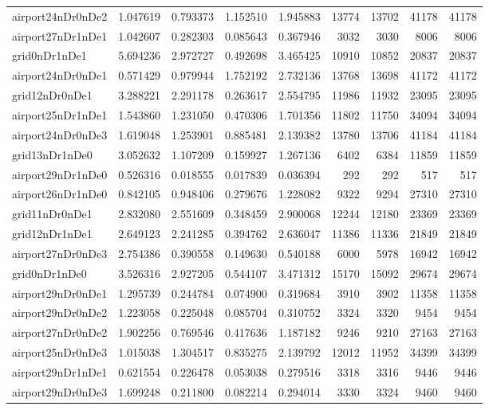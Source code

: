 \begin{longtable}{|l|r|r|r|r|r|r|r|r|}
airport24nDr0nDe2 & 1.047619 & 0.793373 & 1.152510 & 1.945883 & 13774 & 13702 & 41178 & 41178 \\
airport27nDr1nDe1 & 1.042607 & 0.282303 & 0.085643 & 0.367946 & 3032 & 3030 & 8006 & 8006 \\
grid0nDr1nDe1 & 5.694236 & 2.972727 & 0.492698 & 3.465425 & 10910 & 10852 & 20837 & 20837 \\
airport24nDr0nDe1 & 0.571429 & 0.979944 & 1.752192 & 2.732136 & 13768 & 13698 & 41172 & 41172 \\
grid12nDr0nDe1 & 3.288221 & 2.291178 & 0.263617 & 2.554795 & 11986 & 11932 & 23095 & 23095 \\
airport25nDr1nDe1 & 1.543860 & 1.231050 & 0.470306 & 1.701356 & 11802 & 11750 & 34094 & 34094 \\
airport24nDr0nDe3 & 1.619048 & 1.253901 & 0.885481 & 2.139382 & 13780 & 13706 & 41184 & 41184 \\
grid13nDr1nDe0 & 3.052632 & 1.107209 & 0.159927 & 1.267136 & 6402 & 6384 & 11859 & 11859 \\
airport29nDr1nDe0 & 0.526316 & 0.018555 & 0.017839 & 0.036394 & 292 & 292 & 517 & 517 \\
airport26nDr1nDe0 & 0.842105 & 0.948406 & 0.279676 & 1.228082 & 9322 & 9294 & 27310 & 27310 \\
grid11nDr0nDe1 & 2.832080 & 2.551609 & 0.348459 & 2.900068 & 12244 & 12180 & 23369 & 23369 \\
grid12nDr1nDe1 & 2.649123 & 2.241285 & 0.394762 & 2.636047 & 11386 & 11336 & 21849 & 21849 \\
airport27nDr0nDe3 & 2.754386 & 0.390558 & 0.149630 & 0.540188 & 6000 & 5978 & 16942 & 16942 \\
grid0nDr1nDe0 & 3.526316 & 2.927205 & 0.544107 & 3.471312 & 15170 & 15092 & 29674 & 29674 \\
airport29nDr0nDe1 & 1.295739 & 0.244784 & 0.074900 & 0.319684 & 3910 & 3902 & 11358 & 11358 \\
airport29nDr0nDe2 & 1.223058 & 0.225048 & 0.085704 & 0.310752 & 3324 & 3320 & 9454 & 9454 \\
airport27nDr0nDe2 & 1.902256 & 0.769546 & 0.417636 & 1.187182 & 9246 & 9210 & 27163 & 27163 \\
airport25nDr0nDe3 & 1.015038 & 1.304517 & 0.835275 & 2.139792 & 12012 & 11952 & 34399 & 34399 \\
airport29nDr1nDe1 & 0.621554 & 0.226478 & 0.053038 & 0.279516 & 3318 & 3316 & 9446 & 9446 \\
airport29nDr0nDe3 & 1.699248 & 0.211800 & 0.082214 & 0.294014 & 3330 & 3324 & 9460 & 9460 \\

\end{longtable}
